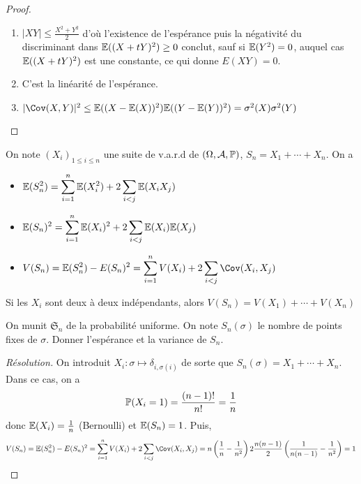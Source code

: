 \begin{proof}~
    \begin{enumerate}
        \item $|XY|\leq \frac{X^2+Y^2}{2}$ d'où l'existence de l'espérance puis la négativité du discriminant dans $\E((X+tY)^2)\geq 0$ conclut, sauf si $\E(Y^2)=0$, auquel cas $\E((X+tY)^2)$ est une constante, ce qui donne $E(XY)=0$.
        \item C'est la linéarité de l'espérance.
        \item $|\Cov(X,Y)|^2\leq \E((X-\E(X))^2)\E((Y-\E(Y))^2)=\sigma^2(X)\sigma^2(Y)$
    \end{enumerate}
\end{proof}

\begin{rem}
    On note $(X_i)_{1\leq i\leq n}$ une suite de v.a.r.d de $(\Omega, \mathcal  A, \P)$, $S_n=X_1+\cdots +X_n$. On a \begin{itemize}
        \item $\displaystyle \E(S_n^2)= \sum_{i=1}^{n} \E(X_i^2)+2\sum_{i<j}\E(X_iX_j)$
        \item $\displaystyle \E(S_n)^2= \sum_{i=1}^{n} \E(X_i)^2+2\sum_{i<j}\E(X_i)\E(X_j)$
        \item $\displaystyle V(S_n)=\E(S_n^2)-E(S_n)^2= \sum_{i=1}^{n} V(X_i)+2\sum_{i<j}\Cov(X_i,X_j)$
    \end{itemize}
    Si les $X_i$ sont deux à deux indépendants, alors $V(S_n)=V(X_1)+\cdots +V(X_n)$
\end{rem}

\begin{ex}
    On munit $\mathfrak S_n $ de la probabilité uniforme. On note $S_n(\sigma)$ le nombre de points fixes de  $\sigma$. Donner l'espérance et la variance de  $S_n$.
\end{ex}

\begin{proof}[Résolution]
    On introduit $X_i:\sigma \longmapsto \delta_{i,\sigma(i)}$ de sorte que $S_n(\sigma)=X_1+\cdots +X_n$. Dans ce cas, on a  \[
        \P(X_i=1)=\frac{(n-1)!}{n!}=\frac{1}{n}
    \] 
    donc $ \E(X_i)=\frac{1}{n}$ (Bernoulli) et $\E(S_n)=1$. Puis, \[
        V(S_n)=\E(S_n^2)-E(S_n)^2= \sum_{i=1}^{n} V(X_i)+2\sum_{i<j}\Cov(X_i,X_j)=n\left( \frac{1}{n}-\frac{1}{n^2} \right) 2 \frac{n(n-1)}{2}\left( \frac{1}{n(n-1)}-\frac{1}{n^2} \right) =1
    \] 
\end{proof}

